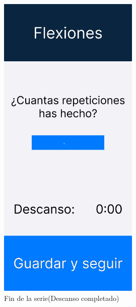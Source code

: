 \begin{figure}[H]
   \centering
    \includegraphics[width=0.6\textwidth]{fotos/Frame 5.png}
    \caption{Fin de la serie(Descanso completado)}
    \label{fig:Fin de la serie(Descanso completado)}
\end{figure}
